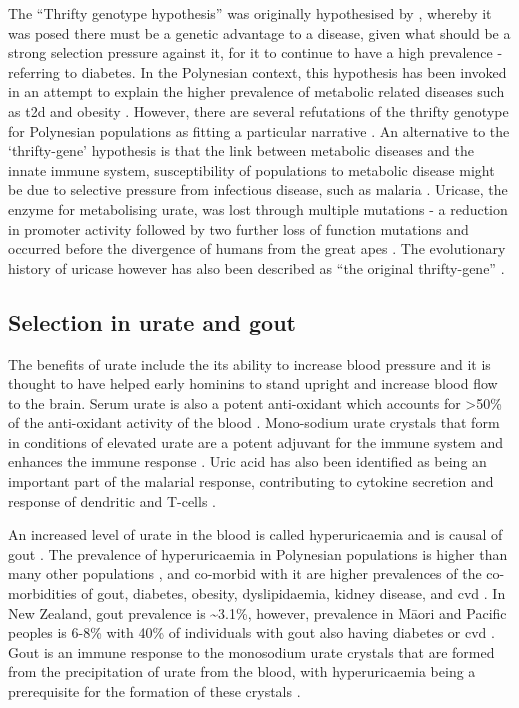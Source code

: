 \documentclass[twoside,openright]{report}
\newcommand{\tex}[1]{#1}
\begin{document}
The ``Thrifty genotype hypothesis'' was originally hypothesised by
\citet{Neel1962}, whereby it was posed there must be a genetic advantage
to a disease, given what should be a strong selection pressure against
it, for it to continue to have a high prevalence - referring to
diabetes. In the Polynesian context, this hypothesis has been invoked in
an attempt to explain the higher prevalence of metabolic related
diseases such as \gls{t2d} and obesity \citep{Myles2011, Minster2016}.
However, there are several refutations of the thrifty genotype for
Polynesian populations as fitting a particular narrative
\citep{Gosling2014, Gosling2015, Cadzow2016}. An alternative to the
`thrifty-gene' hypothesis is that the link between metabolic diseases
and the innate immune system, susceptibility of populations to metabolic
disease might be due to selective pressure from infectious disease, such
as malaria \citep{Gosling2015}. Uricase, the enzyme for metabolising
urate, was lost through multiple mutations - a reduction in promoter
activity followed by two further loss of function mutations and occurred
before the divergence of humans from the great apes \citep{Kratzer2014}.
The evolutionary history of uricase however has also been described as
``the original thrifty-gene'' \citep{Kratzer2014}.

\subsection{Selection in urate and
gout}\label{selection-in-urate-and-gout}

The benefits of urate include the its ability to increase blood pressure
and it is thought to have helped early hominins to stand upright
\citep{Watanabe2002} and increase blood flow to the brain. Serum urate
is also a potent anti-oxidant which accounts for \textgreater{}50\% of
the anti-oxidant activity of the blood
\citep{Glantzounis2005, Parmar2009}. Mono-sodium urate crystals that
form in conditions of elevated urate are a potent adjuvant for the
immune system and enhances the immune response
\citep{Ames1981, Opitz2009}. Uric acid has also been identified as being
an important part of the malarial response, contributing to cytokine
secretion and response of dendritic and T-cells
\citep{GallegoDelgado2014}.

An increased level of urate in the blood is called hyperuricaemia and is
causal of gout \citep{Choi2005a}. The prevalence of hyperuricaemia in
Polynesian populations is higher than many other populations
\citep{Gosling2014}, and co-morbid with it are higher prevalences of the
co-morbidities of gout, diabetes, obesity, dyslipidaemia, kidney
disease, and \gls{cvd} \citep{Winnard2013}. In New Zealand, gout
prevalence is \textasciitilde{}3.1\%, however, prevalence in
M\tex{\={a}}ori and Pacific peoples is 6-8\% with 40\% of individuals
with gout also having diabetes or \gls{cvd} \citep{Winnard2013}. Gout is
an immune response to the monosodium urate crystals that are formed from
the precipitation of urate from the blood, with hyperuricaemia being a
prerequisite for the formation of these crystals \citep{Merriman2011a}.
\end{document}
